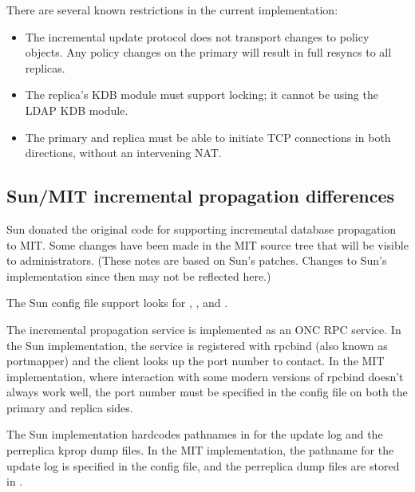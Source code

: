 \documentclass[letterpaper,10pt,english]{sphinxmanual}
\begin{document}
\sphinxAtStartPar
There are several known restrictions in the current implementation:
\begin{itemize}
\item {} 
\sphinxAtStartPar
The incremental update protocol does not transport changes to policy
objects.  Any policy changes on the primary will result in full
resyncs to all replicas.

\item {} 
\sphinxAtStartPar
The replica’s KDB module must support locking; it cannot be using the
LDAP KDB module.

\item {} 
\sphinxAtStartPar
The primary and replica must be able to initiate TCP connections in
both directions, without an intervening NAT.

\end{itemize}


\subsection{Sun/MIT incremental propagation differences}
\label{\detokenize{admin/database:sun-mit-incremental-propagation-differences}}
\sphinxAtStartPar
Sun donated the original code for supporting incremental database
propagation to MIT.  Some changes have been made in the MIT source
tree that will be visible to administrators.  (These notes are based
on Sun’s patches.  Changes to Sun’s implementation since then may not
be reflected here.)

\sphinxAtStartPar
The Sun config file support looks for ,
, and .

\sphinxAtStartPar
The incremental propagation service is implemented as an ONC RPC
service.  In the Sun implementation, the service is registered with
rpcbind (also known as portmapper) and the client looks up the port
number to contact.  In the MIT implementation, where interaction with
some modern versions of rpcbind doesn’t always work well, the port
number must be specified in the config file on both the primary and
replica sides.

\sphinxAtStartPar
The Sun implementation hard\sphinxhyphen{}codes pathnames in  for the
update log and the per\sphinxhyphen{}replica kprop dump files.  In the MIT
implementation, the pathname for the update log is specified in the
config file, and the per\sphinxhyphen{}replica dump files are stored in
{\hyperref[\detokenize{mitK5defaults:paths}]{}}.
\end{document}
